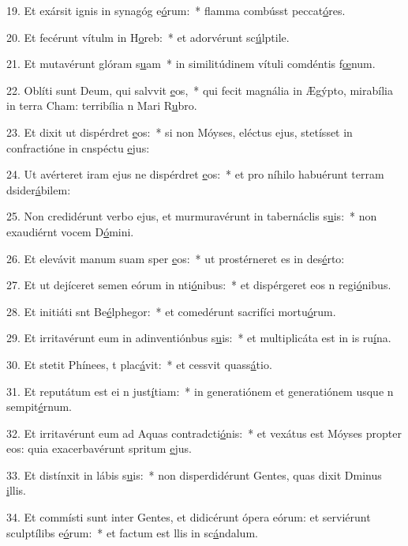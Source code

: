 19. Et exársit ignis in synagóg e\uline{ó}rum:~* flamma combússt peccat\uline{ó}res.\par 
20. Et fecérunt vítulm in H\uline{o}reb:~* et adorvérunt sc\uline{ú}lptile.\par 
21. Et mutavérunt glóram s\uline{u}am~* in similitúdinem vítuli comdéntis f\uline{œ}num.\par 
22. Oblíti sunt Deum, qui salvvit \uline{e}os,~* qui fecit magnália in Ægýpto, mirabília in terra Cham: terribília n Mari R\uline{u}bro.\par 
23. Et dixit ut dispérdret \uline{e}os:~* si non Móyses, eléctus ejus, stetísset in confractióne in cnspéctu \uline{e}jus:\par 
24. Ut avérteret iram ejus ne dispérdret \uline{e}os:~* et pro níhilo habuérunt terram dsider\uline{á}bilem:\par 
25. Non credidérunt verbo ejus, et murmuravérunt in tabernáclis s\uline{u}is:~* non exaudiérnt vocem D\uline{ó}mini.\par 
26. Et elevávit manum suam sper \uline{e}os:~* ut prostérneret es in des\uline{é}rto:\par 
27. Et ut dejíceret semen eórum in nti\uline{ó}nibus:~* et dispérgeret eos n regi\uline{ó}nibus.\par 
28. Et initiáti snt Be\uline{é}lphegor:~* et comedérunt sacrifíci mortu\uline{ó}rum.\par 
29. Et irritavérunt eum in adinventiónbus s\uline{u}is:~* et multiplicáta est in is ru\uline{í}na.\par 
30. Et stetit Phínees, t plac\uline{á}vit:~* et cessvit quass\uline{á}tio.\par 
31. Et reputátum est ei n just\uline{í}tiam:~* in generatiónem et generatiónem usque n sempit\uline{é}rnum.\par 
32. Et irritavérunt eum ad Aquas contradcti\uline{ó}nis:~* et vexátus est Móyses propter eos: quia exacerbavérunt spritum \uline{e}jus.\par 
33. Et distínxit in lábis s\uline{u}is:~* non disperdidérunt Gentes, quas dixit Dminus \uline{i}llis.\par 
34. Et commísti sunt inter Gentes, et didicérunt ópera eórum: et serviérunt sculptílibs e\uline{ó}rum:~* et factum est llis in sc\uline{á}ndalum.\par 
